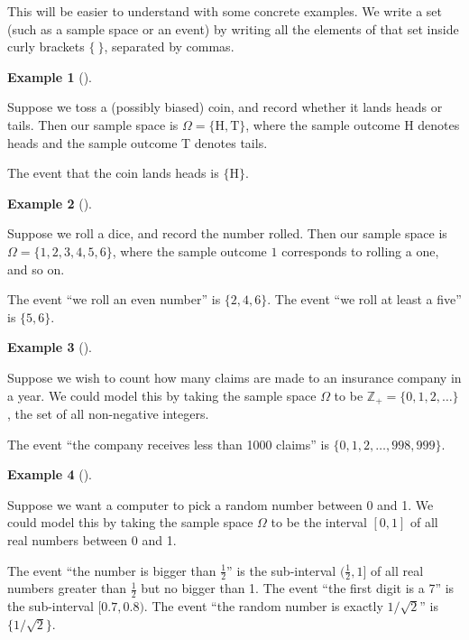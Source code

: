 \documentclass[
  letterpaper,
]{report}
\theoremstyle{definition}
\theoremstyle{definition}
\newtheorem{example}{Example}[chapter]
\theoremstyle{remark}
\begin{document}
This will be easier to understand with some concrete examples. We write
a set (such as a sample space or an event) by writing all the elements
of that set inside curly brackets \(\{\ \}\), separated by commas.

\leavevmode{}%
\begin{example}[]\label{exm-coin-space}

Suppose we toss a (possibly biased) coin, and record whether it lands
heads or tails. Then our sample space is
\(\Omega = \{\mathrm H, \mathrm T\}\), where the sample outcome H
denotes heads and the sample outcome T denotes tails.

The event that the coin lands heads is \(\{\mathrm H\}\).

\end{example}

\leavevmode{}%
\begin{example}[]\label{exm-dice-space}

Suppose we roll a dice, and record the number rolled. Then our sample
space is \(\Omega = \{1,2,3,4,5,6\}\), where the sample outcome \(1\)
corresponds to rolling a one, and so on.

The event ``we roll an even number'' is \(\{2,4,6\}\). The event ``we
roll at least a five'' is \(\{5,6\}\).

\end{example}

\leavevmode{}%
\begin{example}[]\label{exm-claim-space}

Suppose we wish to count how many claims are made to an insurance
company in a year. We could model this by taking the sample space
\(\Omega\) to be \(\mathbb Z_+ = \{0, 1, 2, \dots\}\), the set of all
non-negative integers.

The event ``the company receives less than 1000 claims'' is
\(\{0, 1, 2, \dots, 998, 999\}\).

\end{example}

\leavevmode{}%
\begin{example}[]\label{exm-rng-space}

Suppose we want a computer to pick a random number between 0 and 1. We
could model this by taking the sample space \(\Omega\) to be the
interval \([0, 1]\) of all real numbers between 0 and 1.

The event ``the number is bigger than \(\frac12\)'' is the sub-interval
\((\frac12, 1]\) of all real numbers greater than \(\frac12\) but no
bigger than 1. The event ``the first digit is a 7'' is the sub-interval
\([0.7, 0.8)\). The event ``the random number is exactly
\(1/\sqrt{2}\)'' is \(\{1/\sqrt{2}\}\).

\end{example}
\end{document}
